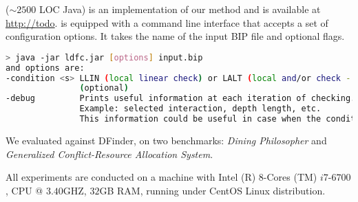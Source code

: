 %
\deadlocktool{} ($\sim 2500$ LOC Java) is an implementation of our method and is available at 
\href{http://todo}{http://todo}. 
%
\deadlocktool{} is equipped with a command line interface that accepts a set 
of configuration options. 
It takes the name of the input BIP file and optional flags. 
\begin{lstlisting}[language=Bash]
> java -jar ldfc.jar [options] input.bip 
and options are:
-condition <s> LLIN (local linear check) or LALT (local and/or check - default)
               (optional)
-debug         Prints useful information at each iteration of checking. 
               Example: selected interaction, depth length, etc.
               This information could be useful in case when the condition fails.
\end{lstlisting}

We evaluated \deadlocktool{} against DFinder, on two benchmarks: {\em Dining Philosopher} and {\em Generalized Conflict-Resource Allocation System}.

All experiments are conducted on a machine with Intel (R) $8$-Cores (TM) $i7$-$6700$, CPU @ $3.40$GHZ, $32$GB RAM, running under CentOS Linux distribution. 